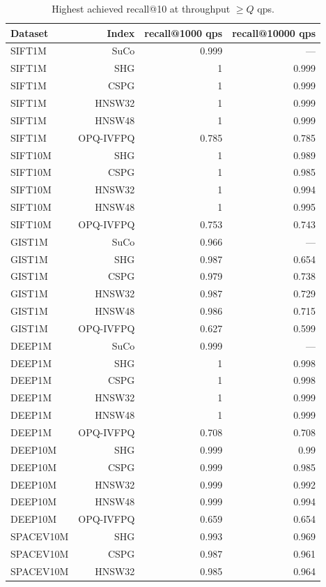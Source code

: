 \begin{table}[t]
\centering
\small
\caption{Highest achieved recall@10 at throughput \(\geq Q\) qps.}
\label{tab:recall-at-qps-k10}
\begin{tabular}{lrrr}
\toprule
Dataset & Index & recall@1000 qps & recall@10000 qps \\
\midrule
SIFT1M & SuCo & 0.999 & — \\
SIFT1M & SHG & 1 & 0.999 \\
SIFT1M & CSPG & 1 & 0.999 \\
SIFT1M & HNSW32 & 1 & 0.999 \\
SIFT1M & HNSW48 & 1 & 0.999 \\
SIFT1M & OPQ-IVFPQ & 0.785 & 0.785 \\
SIFT10M & SHG & 1 & 0.989 \\
SIFT10M & CSPG & 1 & 0.985 \\
SIFT10M & HNSW32 & 1 & 0.994 \\
SIFT10M & HNSW48 & 1 & 0.995 \\
SIFT10M & OPQ-IVFPQ & 0.753 & 0.743 \\
GIST1M & SuCo & 0.966 & — \\
GIST1M & SHG & 0.987 & 0.654 \\
GIST1M & CSPG & 0.979 & 0.738 \\
GIST1M & HNSW32 & 0.987 & 0.729 \\
GIST1M & HNSW48 & 0.986 & 0.715 \\
GIST1M & OPQ-IVFPQ & 0.627 & 0.599 \\
DEEP1M & SuCo & 0.999 & — \\
DEEP1M & SHG & 1 & 0.998 \\
DEEP1M & CSPG & 1 & 0.998 \\
DEEP1M & HNSW32 & 1 & 0.999 \\
DEEP1M & HNSW48 & 1 & 0.999 \\
DEEP1M & OPQ-IVFPQ & 0.708 & 0.708 \\
DEEP10M & SHG & 0.999 & 0.99 \\
DEEP10M & CSPG & 0.999 & 0.985 \\
DEEP10M & HNSW32 & 0.999 & 0.992 \\
DEEP10M & HNSW48 & 0.999 & 0.994 \\
DEEP10M & OPQ-IVFPQ & 0.659 & 0.654 \\
SPACEV10M & SHG & 0.993 & 0.969 \\
SPACEV10M & CSPG & 0.987 & 0.961 \\
SPACEV10M & HNSW32 & 0.985 & 0.964 \\

\end{tabular}
\end{table}
